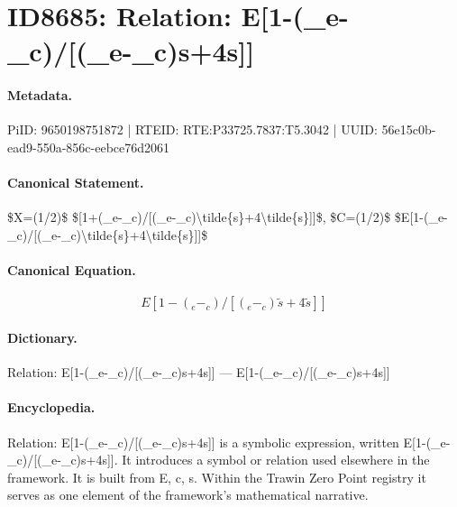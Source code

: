 \section*{ID8685: Relation: E[1-(\_e-\_c)/[(\_e-\_c)s+4s]]}
\paragraph{Metadata.}
PiID: 9650198751872 | RTEID: RTE:P33725.7837:T5.3042 | UUID: 56e15c0b-ead9-550a-856c-eebce76d2061

\paragraph{Canonical Statement.}
\$X=(1/2)\$ \$[1+(\_e-\_c)/[(\_e-\_c)\textbackslash{}tilde\{s\}+4\textbackslash{}tilde\{s\}]]\$, \$C=(1/2)\$ \$E[1-(\_e-\_c)/[(\_e-\_c)\textbackslash{}tilde\{s\}+4\textbackslash{}tilde\{s\}]]\$

\paragraph{Canonical Equation.}
\[
E[1-(_e-_c)/[(_e-_c)\tilde{s}+4\tilde{s}]]
\]

\paragraph{Dictionary.}
Relation: E[1-(\_e-\_c)/[(\_e-\_c)s+4s]] — E[1-(\_e-\_c)/[(\_e-\_c)s+4s]]

\paragraph{Encyclopedia.}
Relation: E[1-(\_e-\_c)/[(\_e-\_c)s+4s]] is a symbolic expression, written E[1-(\_e-\_c)/[(\_e-\_c)s+4s]]. It introduces a symbol or relation used elsewhere in the framework. It is built from E, c, s. Within the Trawin Zero Point registry it serves as one element of the framework's mathematical narrative.
